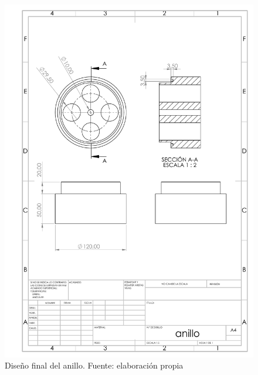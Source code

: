 \begin{itemize}
    \begin{figure}[H]
        \centering
        \includegraphics[width=\linewidth]{Imagenes/2019/anillo2019.PDF} 
        \caption{Dise\~no final del anillo. Fuente: elaboración propia}
        \label{fig:Anillo2019}
        \end{figure}
    \end{itemize}


